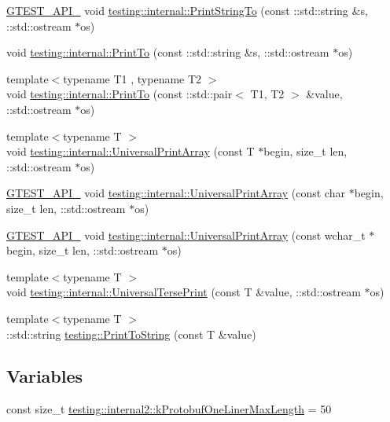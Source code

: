 \begin{DoxyCompactItemize}
\item 
\hyperlink{gtest-port_8h_aa73be6f0ba4a7456180a94904ce17790}{G\+T\+E\+S\+T\+\_\+\+A\+P\+I\+\_\+} void \hyperlink{namespacetesting_1_1internal_a8b53e46cea3f8bdfc9342057c4f6ba62}{testing\+::internal\+::\+Print\+String\+To} (const \+::std\+::string \&s, \+::std\+::ostream $\ast$os)
\item 
void \hyperlink{namespacetesting_1_1internal_af59b4f5d83276cd807c45063b14bad44}{testing\+::internal\+::\+Print\+To} (const \+::std\+::string \&s, \+::std\+::ostream $\ast$os)
\item 
{\footnotesize template$<$typename T1 , typename T2 $>$ }\\void \hyperlink{namespacetesting_1_1internal_af2c33928facbf2edf7af564278724d98}{testing\+::internal\+::\+Print\+To} (const \+::std\+::pair$<$ T1, T2 $>$ \&value, \+::std\+::ostream $\ast$os)
\item 
{\footnotesize template$<$typename T $>$ }\\void \hyperlink{namespacetesting_1_1internal_ad79d71c3110f8eb24ab352d68f29436a}{testing\+::internal\+::\+Universal\+Print\+Array} (const T $\ast$begin, size\+\_\+t len, \+::std\+::ostream $\ast$os)
\item 
\hyperlink{gtest-port_8h_aa73be6f0ba4a7456180a94904ce17790}{G\+T\+E\+S\+T\+\_\+\+A\+P\+I\+\_\+} void \hyperlink{namespacetesting_1_1internal_a72c997dbd2c562110b2cb56c359decfa}{testing\+::internal\+::\+Universal\+Print\+Array} (const char $\ast$begin, size\+\_\+t len, \+::std\+::ostream $\ast$os)
\item 
\hyperlink{gtest-port_8h_aa73be6f0ba4a7456180a94904ce17790}{G\+T\+E\+S\+T\+\_\+\+A\+P\+I\+\_\+} void \hyperlink{namespacetesting_1_1internal_ae31e146c35fd75afc6a9cc73ae2692d1}{testing\+::internal\+::\+Universal\+Print\+Array} (const wchar\+\_\+t $\ast$begin, size\+\_\+t len, \+::std\+::ostream $\ast$os)
\item 
{\footnotesize template$<$typename T $>$ }\\void \hyperlink{namespacetesting_1_1internal_afa92f5a284929dc3723e654a25feb7b9}{testing\+::internal\+::\+Universal\+Terse\+Print} (const T \&value, \+::std\+::ostream $\ast$os)
\item 
{\footnotesize template$<$typename T $>$ }\\\+::std\+::string \hyperlink{namespacetesting_aa5717bb1144edd1d262d310ba70c82ed}{testing\+::\+Print\+To\+String} (const T \&value)
\end{DoxyCompactItemize}
\subsection*{Variables}
\begin{DoxyCompactItemize}
\item 
const size\+\_\+t \hyperlink{namespacetesting_1_1internal2_a140c8efd51e63a3def98445bff107518}{testing\+::internal2\+::k\+Protobuf\+One\+Liner\+Max\+Length} = 50
\end{DoxyCompactItemize}


